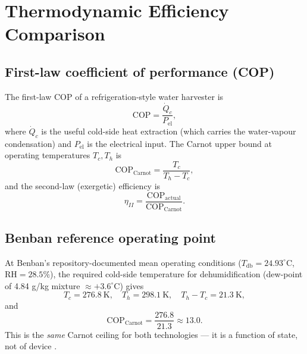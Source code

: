 \documentclass[11pt,a4paper]{article}
\begin{document}
\section{Thermodynamic Efficiency Comparison}
\label{sec:efficiency}

\subsection{First-law coefficient of performance (COP)}
The first-law COP of a refrigeration-style water harvester is
\begin{equation}
\mathrm{COP} = \frac{\dot{Q}_c}{P_{\mathrm{el}}},
\label{eq:cop_def}
\end{equation}
where $\dot{Q}_c$ is the useful cold-side heat extraction (which carries the water-vapour condensation) and $P_{\mathrm{el}}$ is the electrical input. The Carnot upper bound at operating temperatures $T_c,T_h$ is
\begin{equation}
\mathrm{COP}_{\mathrm{Carnot}} = \frac{T_c}{T_h - T_c},
\label{eq:cop_carnot}
\end{equation}
and the second-law (exergetic) efficiency is
\begin{equation}
\eta_{II} = \frac{\mathrm{COP}_{\mathrm{actual}}}{\mathrm{COP}_{\mathrm{Carnot}}}.
\label{eq:eta_ii}
\end{equation}

\subsection{Benban reference operating point}
At Benban's repository-documented mean operating conditions ($T_{\mathrm{db}}{=}24.93^{\circ}$C, $\mathrm{RH}{=}28.5\%$), the required cold-side temperature for dehumidification (dew-point of 4.84 g/kg mixture $\approx +3.6^{\circ}$C) gives
\begin{equation}
T_c=276.8\ \mathrm{K},\quad T_h=298.1\ \mathrm{K},\quad T_h-T_c=21.3\ \mathrm{K},
\end{equation}
and
\begin{equation}
\mathrm{COP}_{\mathrm{Carnot}} = \frac{276.8}{21.3} \approx 13.0.
\end{equation}
This is the \emph{same} Carnot ceiling for both technologies --- it is a function of state, not of device \citep{cengel2019thermo}.
\end{document}
